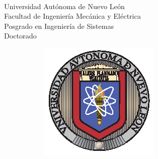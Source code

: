 \thispagestyle{empty}
\vspace{10 cm}
\begin{scshape}
\begin{center}
	{$\,$} \\[20 mm]
	{\Large{Universidad Autónoma de Nuevo León}} \\[5mm]
	{\large{Facultad de Ingeniería Mecánica y Eléctrica}} \\[5mm]
	{\large{Posgrado en Ingeniería de Sistemas}} \\[5 mm]
	{\large{Doctorado}}
	\vskip16mm
	\begin{figure}[h!]
		\centering
		\begin{subfigure}{0.3\linewidth}
			\includegraphics[width=\linewidth]{Figuras/uanl}
		\end{subfigure}
		\hspace{15 mm}
		\begin{subfigure}{0.2\linewidth}

\end{subfigure}
\end{figure}
\end{center}
\end{scshape}
